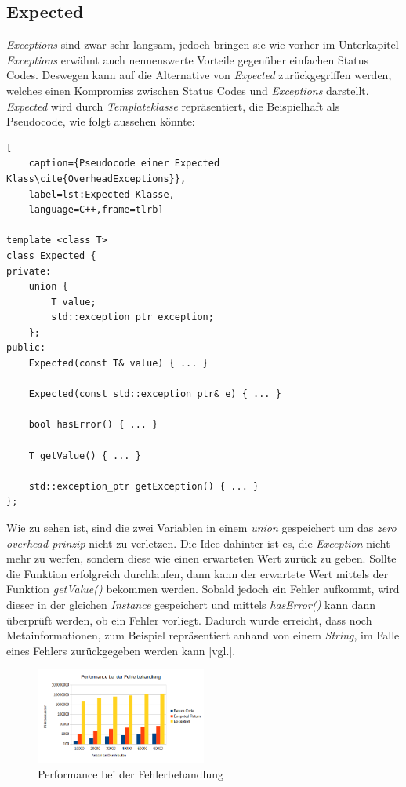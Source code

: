 \subsection{Expected}
\emph{Exceptions} sind zwar sehr langsam, jedoch bringen sie wie vorher im Unterkapitel
\emph{Exceptions} erwähnt auch nennenswerte Vorteile gegenüber einfachen Status Codes. Deswegen
kann auf die Alternative von \emph{Expected} zurückgegriffen werden, welches einen Kompromiss
zwischen Status Codes und \emph{Exceptions} darstellt. \emph{Expected} wird durch
\emph{Templateklasse} repräsentiert, die Beispielhaft als Pseudocode, wie folgt aussehen könnte:

\begin{lstlisting}[
    caption={Pseudocode einer Expected Klass\cite{OverheadExceptions}},
    label=lst:Expected-Klasse,
    language=C++,frame=tlrb]
  				
template <class T>
class Expected {
private:
    union {
        T value;
        std::exception_ptr exception;
    };
public:
    Expected(const T& value) { ... }
    
    Expected(const std::exception_ptr& e) { ... }
    
    bool hasError() { ... }
    
    T getValue() { ... }
    
    std::exception_ptr getException() { ... }
};
\end{lstlisting}

Wie zu sehen ist, sind die zwei Variablen in einem \emph{union} gespeichert um das \emph{zero
overhead prinzip} nicht zu verletzen. Die Idee dahinter ist es, die \emph{Exception} nicht mehr
zu werfen, sondern diese wie einen erwarteten Wert zurück zu geben. Sollte die Funktion
erfolgreich durchlaufen, dann kann der erwartete Wert mittels der Funktion \emph{getValue()}
bekommen werden. Sobald jedoch ein Fehler aufkommt, wird dieser in der gleichen \emph{Instance}
gespeichert und mittels \emph{hasError()} kann dann überprüft werden, ob ein Fehler vorliegt.
Dadurch wurde erreicht, dass noch Metainformationen, zum Beispiel repräsentiert anhand von einem
\emph{String}, im Falle eines Fehlers zurückgegeben werden kann \cite{OverheadExceptions}[vgl.].
\newline

\begin{figure}[h]
    \centering
    \includegraphics[width=0.5\textwidth]{bilder/Performance_Fehlerbehandlung}
    \caption[Fehlerbehandlung]{Performance bei der Fehlerbehandlung}
    \label{img:fehlerbehandlung}
\end{figure}

